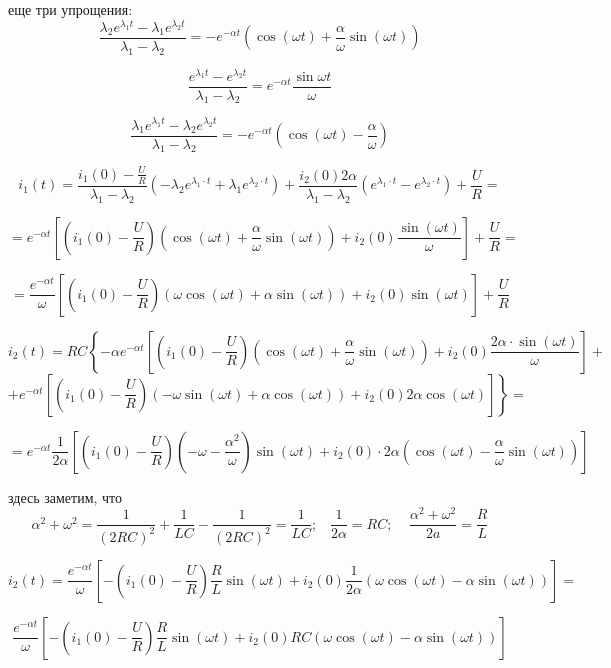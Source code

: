 \documentclass[a4paper,12pt]{article}
\begin{document}
еще три упрощения:
$$
\frac{\lambda_2e^{\lambda_1t} - \lambda_1e^{\lambda_2t}}{\lambda_1-\lambda_2} = -e^{-\alpha t}
\left(\cos(\omega t) + \frac{\alpha}{\omega} \sin(\omega t)\right)
$$

$$
\frac{e^{\lambda_1t} - e^{\lambda_2t}}{\lambda_1-\lambda_2} = e^{-\alpha t}
\frac{\sin\omega t}{\omega}
$$

$$
\frac{\lambda_1e^{\lambda_1t} - \lambda_2e^{\lambda_2t}}{\lambda_1-\lambda_2} = -e^{-\alpha t}
\left(\cos(\omega t) - \frac{\alpha}{\omega}\right)
$$

$$
i_1(t) = \frac{i_1(0) - \frac{U}{R}}{\lambda_1-\lambda_2} \left( -\lambda_2e^{\lambda_1 \cdot t}  + \lambda_1e^{\lambda_2 \cdot t} \right)
+\frac{i_2(0)2\alpha}{\lambda_1 - \lambda_2} \left(e^{\lambda_1\cdot t} - e^{\lambda_2\cdot t}\right)  + \frac{U}{R}=
$$

$$
= e^{-\alpha t} \left[ \left(i_1(0) - \frac{U}{R}\right)
\left(\cos(\omega t) + \frac{\alpha}{\omega} \sin(\omega t)\right)
+ i_2(0) \frac{\sin(\omega t)}{\omega} \right]  + \frac{U}{R} =
$$

$$
= \frac{e^{-\alpha t}}{\omega} \left[ \left(i_1(0) - \frac{U}{R}\right)
\left(\omega\cos(\omega t) + \alpha \sin(\omega t)\right)
+ i_2(0) \sin(\omega t) \right]  + \frac{U}{R}
$$


$$
i_2(t) = RC\left\{-\alpha e^{-\alpha t} \left[ \left(i_1(0) - \frac{U}{R}\right)
\left(\cos(\omega t) + \frac{\alpha}{\omega} \sin(\omega t)\right)
+ i_2(0) \frac{2\alpha\cdot\sin(\omega t)}{\omega} \right]\right. +
$$
$$
+ \left.e^{-\alpha t} \left[  \left(i_1(0) - \frac{U}{R}\right) 
\left(-\omega\sin(\omega t) + \alpha \cos(\omega t)\right) + i_2(0)2\alpha\cos(\omega t)
\right]\right\} =
$$

$$
=  e^{-\alpha t} \frac{1}{2\alpha} \left[ \left(i_1(0) - \frac{U}{R}\right)
\left(-\omega - \frac{\alpha^2}{\omega}\right)\sin(\omega t) + 
i_2(0)\cdot 2\alpha\left(\cos(\omega t) - \frac{\alpha}{\omega}\sin(\omega t)\right)
\right] 
$$

здесь заметим, что 
$$
\alpha^2 + \omega^2 = \frac{1}{(2RC)^2} + \frac{1}{LC} - \frac{1}{(2RC)^2} = \frac{1}{LC}; \;\;\; 
\frac{1}{2\alpha} = RC; \;\;\;\; \frac{\alpha^2+\omega^2}{2a} = \frac{R}{L}
$$


$$
i_2(t)=\frac{e^{-\alpha t}}{\omega}
\left[ -\left(i_1(0) - \frac{U}{R}\right)\frac{R}{L}\sin(\omega t) 
+ i_2(0) \frac{1}{2\alpha} \left(\omega \cos(\omega t) - \alpha\sin(\omega t)\right)
\right] =
$$

$$
\frac{e^{-\alpha t}}{\omega}
\left[ -\left(i_1(0) - \frac{U}{R}\right)\frac{R}{L}\sin(\omega t)
+ i_2(0) RC \left(\omega \cos(\omega t) - \alpha\sin(\omega t)\right)
\right]
$$
\end{document}
